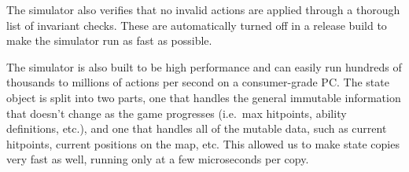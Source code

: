 The simulator also verifies that no invalid actions are applied through a
thorough list of invariant checks. These are automatically turned off in a
release build to make the simulator run as fast as possible.

The simulator is also built to be high performance and can easily run hundreds
of thousands to millions of actions per second on a consumer-grade PC\@.
The state object is split into two parts, one that handles the
general immutable information that doesn't change as the game progresses (i.e.\
max hitpoints, ability definitions, etc.), and one that handles all of the
mutable data, such as current hitpoints, current positions on the map, etc.
This allowed us to make state copies very fast as well, running only at a few
microseconds per copy.

